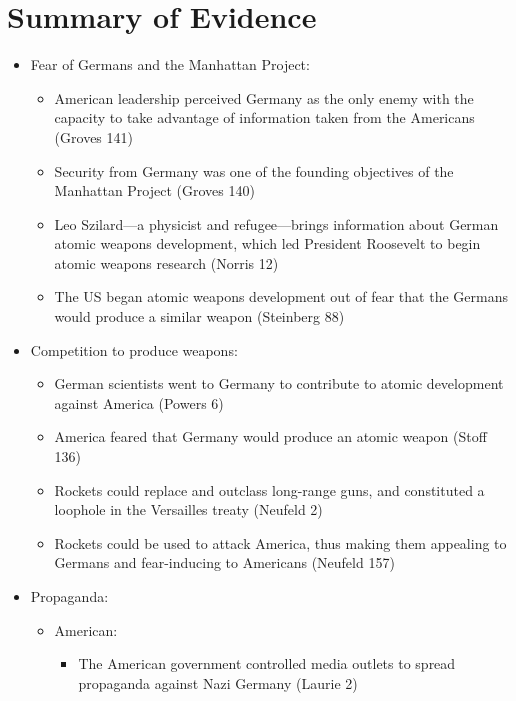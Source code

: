 \documentclass[a4paper]{article}
\begin{document}
    \section{Summary of Evidence}
        \begin{itemize}
            \item Fear of Germans and the Manhattan Project:
            \begin{itemize}
                \item American leadership perceived Germany as the only enemy with the capacity to take advantage of information taken from the Americans (Groves 141)
                \item Security from Germany was one of the founding objectives of the Manhattan Project (Groves 140)
                \item Leo Szilard---a physicist and refugee---brings information about German atomic weapons development, which led President Roosevelt to begin  atomic weapons research (Norris 12)
                \item The US began atomic weapons development out of fear that the Germans would produce a similar weapon (Steinberg 88)
            \end{itemize}
            \item Competition to produce weapons:
            \begin{itemize}
                \item German scientists went to Germany to contribute to atomic development against America (Powers 6)
                \item America feared that Germany would produce an atomic weapon (Stoff 136)
                \item Rockets could replace and outclass long-range guns, and constituted a loophole in the Versailles treaty (Neufeld 2)
                \item Rockets could be used to attack America, thus making them appealing to Germans and fear-inducing to Americans (Neufeld 157)
            \end{itemize}
            \item Propaganda:
            \begin{itemize}
                \item American:
                \begin{itemize}
                    \item The American government controlled media outlets to spread propaganda against Nazi Germany (Laurie 2)

\end{itemize}
\end{itemize}
\end{itemize}
\end{document}
